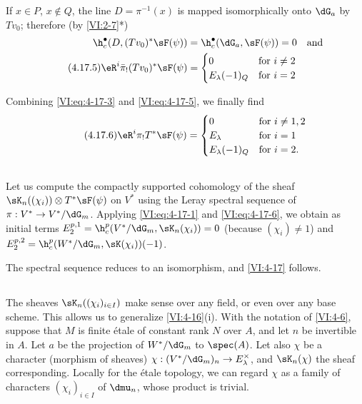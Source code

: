 \documentclass[oneside]{book}
\begin{document}
If $x\in P$, $x\notin Q$, the line $D=\pi^{-1}(x)$ is mapped 
isomorphically onto $\dG_a$ by $T v_0$; therefore (by 
\ref{VI:2-7}*) 
\begin{align} \notag 
  \h_c^\bullet(D,(T v_0)^\ast \sF(\psi)) &= \h_c^\bullet(\dG_a,\sF(\psi)) = 0 && \text{and} \\
  \tag{4.17.5}\label{VI:eq:4-17-5}
  \eR^i \bar\pi_! (T v_0)^\ast \sF(\psi) 
    &= \begin{cases} 
         0 & \text{for $i\ne 2$} \\
         E_\lambda(-1)_Q & \text{for $i=2$} 
       \end{cases} 
\end{align}

Combining \eqref{VI:eq:4-17-3} and \eqref{VI:eq:4-17-5}, we finally find 
\begin{equation*}\tag{4.17.6}\label{VI:eq:4-17-6}
  \eR^i \pi_! T^\ast\sF(\psi) = 
    \begin{cases}
      0 & \text{for $i\ne 1,2$} \\
      E_\lambda & \text{for $i=1$} \\
      E_\lambda(-1)_Q & \text{for $i=2$.} 
    \end{cases}
\end{equation*}





\subsection{}\label{VI:4-18}

Let us compute the compactly supported cohomology of the sheaf 
$\sK_n((\chi_i))\otimes T^\ast \sF(\psi)$ on $V^\ast$ using the 
Leray spectral sequence of $\pi:V^\ast\to V^\ast/\dG_m$. Applying 
\eqref{VI:eq:4-17-1} and \eqref{VI:eq:4-17-6}, we obtain as initial terms 
$E_2^{p,1} = \h_c^p(V^\ast/\dG_m,\sK_n(\chi_i)) = 0$ (because $(\chi_i)\ne 1$) 
and $E_2^{p,2} = \h_c^p(W^\ast/\dG_m,\sK(\chi_i))(-1)$. 

The spectral sequence reduces to an isomorphism, and \ref{VI:4-17} follows. 





\subsection{}\label{VI:4-19}

The sheaves $\sK_n((\chi_i)_{i\in I})$ make sense over any field, 
or even over any base scheme. This allows us to generalize 
\ref{VI:4-16}(i). With the notation of \ref{VI:4-6}, suppose that $M$ is finite 
étale of constant rank $N$ over $A$, and let $n$ be invertible in $A$. 
Let $a$ be the projection of $W^\ast/\dG_m$ to $\spec(A)$. Let also $\chi$ be 
a character (morphism of sheaves) 
$\chi:(V^\ast/\dG_m)_n \to E_\lambda^\times$, and $\sK_n(\chi)$ the sheaf 
corresponding. Locally for the étale topology, we can regard $\chi$ 
as a family of characters $(\chi_i)_{i\in I}$ of $\dmu_n$, whose product is 
trivial.
\end{document}
